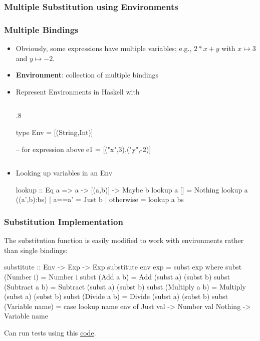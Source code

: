 \documentclass{beamer}
\newenvironment{codeblock}[1][.8]{%
\begin{columns}
\begin{column}{#1\linewidth}
\begin{exampleblock}{}}{%
\end{exampleblock}
\end{column}
\end{columns}}
\begin{document}
\subsubsection{Multiple Substitution using Environments}

\begin{frame}[fragile]
\frametitle{Multiple Bindings}

\begin{itemize}
\item Obviously, some expressions have multiple variables; e.g., $2 * x + y$ with $x\mapsto 3$ and $y\mapsto -2$.

\pause
\item {\bf Environment}: collection of multiple bindings

\pause
\item Represent Environments in Haskell with 
\begin{codeblock}
\begin{hcode}
type Env = [(String,Int)]

-- for expression above
e1 = [("x",3),("y",-2)]
\end{hcode}
\end{codeblock}

\pause
\item Looking up variables in an Env
\begin{hcode}
lookup :: Eq a => a -> [(a,b)] -> Maybe b
lookup a [] = Nothing
lookup a ((a',b):bs) 
    | a==a'     = Just b
    | otherwise = lookup a bs
\end{hcode}

\end{itemize}

\end{frame}


\begin{frame}[fragile]
\frametitle{Substitution Implementation}

The substitution function is easily modified to work with environments rather than single bindings:

\begin{tinycode}
substitute :: Env -> Exp -> Exp
substitute env exp = subst exp where
  subst (Number i)      = Number i
  subst (Add a b)       = Add (subst a) (subst b)
  subst (Subtract a b)  = Subtract (subst a) (subst b)
  subst (Multiply a b)  = Multiply (subst a) (subst b)
  subst (Divide a b)    = Divide (subst a) (subst b)
  subst (Variable name) =
    case lookup name env of
      Just val -> Number val
      Nothing  -> Variable name
\end{tinycode}

Can run tests using this \href{https://harrisonwl.github.io/assets/courses/popl/fall2016/aopl/code/SubstituteTest.hs.htm}{code}.

\end{frame}
\end{document}
